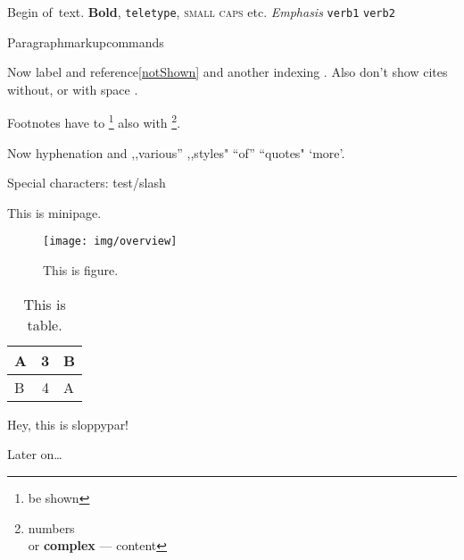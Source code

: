 \documentclass[draft]{article}
\begin{document}
\tableofcontents
\setcounter{page}{2142}

Begin of~text. \textbf{Bold}, \texttt{teletype}, \textsc{small caps} etc.
\emph{Emphasis} \verb+verb1+ \verb!verb2!

Paragraph\linebreak[3]markup\linebreak{}commands

Now label\label{notShown} and reference\ref{notShown} and
another\pageref{notShown} indexing . Also don't show
cites without\cite{notShown}, or with space \cite{notShown}.

Footnotes have to \footnote{be shown} also with \footnote[0]{numbers\\or
\textbf{complex} --- content}.

Now hy\-phe\-na\-tion and ,,various'' ,,styles" ``of'' ``quotes" `more'.

Special characters: test\slash{}slash

\begin{minipage}
This is minipage.
\end{minipage}

\begin{figure}[htp]
	\centering
	\texttt{[image: img/overview]}
	\caption{This is figure.}
\end{figure}

\begin{table}[H]
\begin{tabular}{|l|r|l|}
\hline
A & 3 & B \\ \hline
B & 4 & A \\ \hline
\end{tabular}
\caption{This is table.}
\end{table}

\begin{sloppypar}
Hey, this is sloppypar!
\end{sloppypar}

Later on\ldots

\cleardoublepage
{}
{}
\printindex
\end{document}
